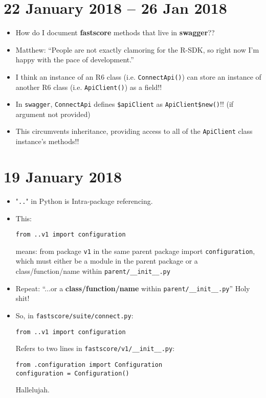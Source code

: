 \documentclass{article}
\begin{document}
\section*{22 January 2018 -- 26 Jan 2018}
\begin{itemize}
\item How do I document {\bf fastscore} methods that live in {\bf swagger}?? 
\item Matthew: ``People are not exactly clamoring for the R-SDK, so right now I'm happy with the pace of development.''
\item I think an instance of an R6 class (i.e. \verb|ConnectApi()|) can store an instance of another R6 class (i.e. \verb|ApiClient()|) as a field!!
\item In \verb|swagger|, \verb|ConnectApi| defines \verb|$apiClient| as \verb|ApiClient$new()|!! (if argument not provided)
\item This circumvents inheritance, providing access to all of the \verb|ApiClient| class instance's methods!!
\end{itemize}

\section*{19 January 2018}
\begin{itemize}
\item "\verb|..|" in Python is Intra-package referencing.
\item This:
\begin{verbatim}
from ..v1 import configuration
\end{verbatim}
means: from package \verb|v1| in the same parent package import \verb|configuration|, which must either be a module in the parent package or a class/function/name within \verb|parent/__init__.py|
\item Repeat: ``...or a {\bf class/function/name} within \verb|parent/__init__.py|'' Holy shit!
\item So, in \verb|fastscore/suite/connect.py|:
\begin{verbatim}
from ..v1 import configuration
\end{verbatim}
Refers to two lines in \verb|fastscore/v1/__init__.py|:
\begin{verbatim}
from .configuration import Configuration
configuration = Configuration()
\end{verbatim}
Hallelujah.
\end{itemize}
\end{document}

